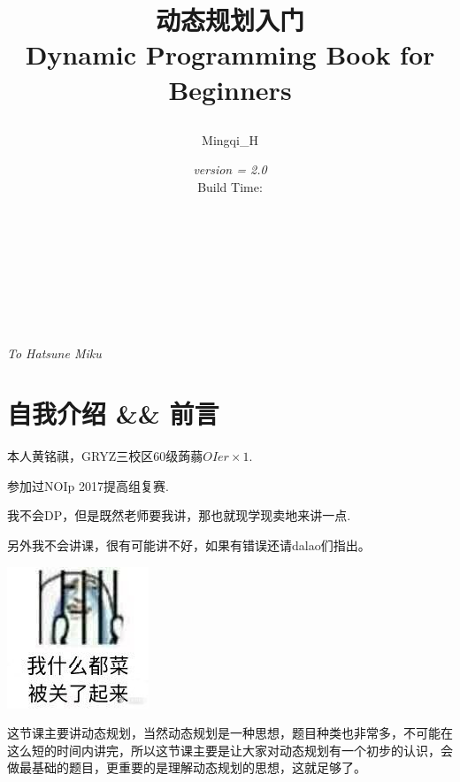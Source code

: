 \documentclass{article}
\theoremstyle{nonumberplain}
\begin{document}
\title{\Huge 动态规划入门\\\Large Dynamic Programming Book for Beginners\\\author{Mingqi\_H}\date{\emph{version = 2.0\alpha}\\Build Time: \DTMnow}}
\maketitle

\thispagestyle{empty}%
\pagestyle{empty}%

\ \\
\ \\
\ \\
\newpage
\ \\\ \\
\begin{center}\em{\large{To Hatsune Miku}}\end{center}
\newpage
\tableofcontents
\newpage

\pagestyle{plain}%
\setcounter{page}{1}
\setcounter{section}{-1}

\section{自我介绍 \&\& 前言}

本人黄铭祺，GRYZ三校区60级蒟蒻$OIer\times 1$.

参加过NOIp 2017提高组复赛.

我不会DP，但是既然老师要我讲，那也就现学现卖地来讲一点.

另外我不会讲课，很有可能讲不好，如果有错误还请dalao们指出。

\begin{center}\includegraphics[scale=0.25]{iampoor.jpg}\end{center}

这节课主要讲动态规划，当然动态规划是一种思想，题目种类也非常多，不可能在这么短的时间内讲完，所以这节课主要是让大家对动态规划有一个初步的认识，会做最基础的题目，更重要的是理解动态规划的思想，这就足够了。
\end{document}
